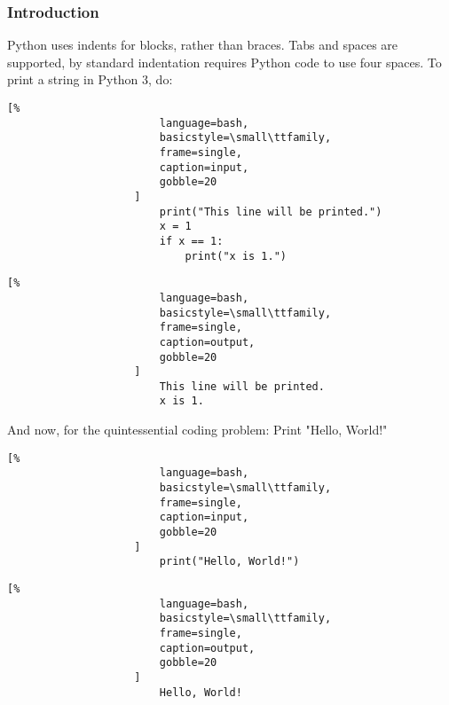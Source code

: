 \documentclass[crop=false,class=book,oneside]{standalone}
\begin{document}
            \subsubsection{Introduction}
                Python uses indents for blocks, rather than braces.
                Tabs and spaces are supported, by standard indentation
                requires Python code to use four spaces.
                To print a string in Python 3, do:
                \newline
                \begin{minipage}[t]{.48\textwidth}
                    \centering
                    \begin{lstlisting}[%
                        language=bash,
                        basicstyle=\small\ttfamily,
                        frame=single,
                        caption=input,
                        gobble=20
                    ]
                        print("This line will be printed.")
                        x = 1
                        if x == 1:
                            print("x is 1.")
                    \end{lstlisting}
                \end{minipage}
                \hfill
                \begin{minipage}[t]{.48\textwidth}
                    \centering
                    \begin{lstlisting}[%
                        language=bash,
                        basicstyle=\small\ttfamily,
                        frame=single,
                        caption=output,
                        gobble=20
                    ]
                        This line will be printed.
                        x is 1.
                    \end{lstlisting}
                \end{minipage}
                And now, for the quintessential coding problem:
                Print "Hello, World!"\newline
                \begin{minipage}[t]{.48\textwidth}
                    \centering
                    \begin{lstlisting}[%
                        language=bash,
                        basicstyle=\small\ttfamily,
                        frame=single,
                        caption=input,
                        gobble=20
                    ]
                        print("Hello, World!")
                    \end{lstlisting}
                \end{minipage}
                \hfill
                \begin{minipage}[t]{.48\textwidth}
                    \centering
                    \begin{lstlisting}[%
                        language=bash,
                        basicstyle=\small\ttfamily,
                        frame=single,
                        caption=output,
                        gobble=20
                    ]
                        Hello, World!
                \end{lstlisting}
                \end{minipage}
\end{document}
